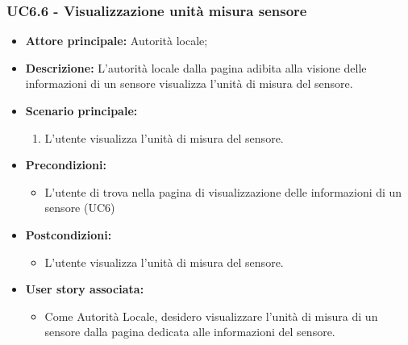 \subsubsection{UC6.6 - Visualizzazione unità misura sensore}
\begin{itemize}
    \item \textbf{Attore principale:} Autorità locale;
    \item \textbf{Descrizione:} L’autorità locale dalla pagina adibita alla visione delle informazioni di un sensore visualizza l'unità di misura del sensore.
    \item \textbf{Scenario principale:}
          \begin{enumerate}
              \item L'utente visualizza l'unità di misura del sensore.
          \end{enumerate}
    \item \textbf{Precondizioni:}
          \begin{itemize}
              \item  L'utente di trova nella pagina di visualizzazione delle informazioni di un sensore (UC6)
          \end{itemize}
    \item \textbf{Postcondizioni:}
          \begin{itemize}
              \item  L'utente visualizza l'unità di misura del sensore.
          \end{itemize}
    \item \textbf{User story associata:}
          \begin{itemize}
              \item Come Autorità Locale, desidero visualizzare l'unità di misura di un sensore dalla pagina dedicata alle informazioni del sensore.
          \end{itemize}
\end{itemize}